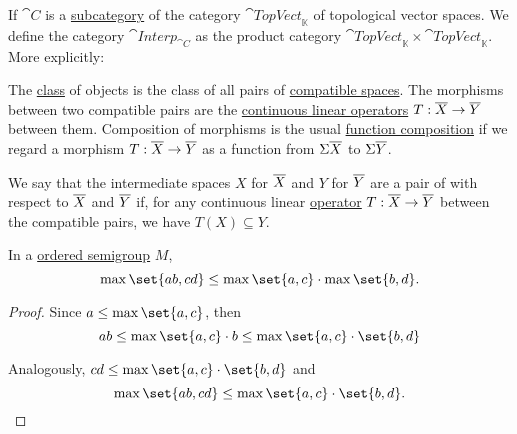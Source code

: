 \begin{definition}
\begin{thmenum}
     If \( \cat{C} \) is a \hyperref[def:subcategory]{subcategory} of the category \hyperref[def:category_of_topological_vector_spaces]{\( \cat{TopVect}_{\BbbK} \)} of topological vector spaces. We define the category \( \cat{Interp}_{\cat{C}} \) as the product category \( \cat{TopVect}_{\BbbK} \times \cat{TopVect}_{\BbbK} \). More explicitly:
    \begin{refenum}
       The \hyperref[def:set]{class} of objects is the class of all pairs of \hyperref[def:interpolated_topological_vector_space/compatibility]{compatible spaces}.
       The morphisms between two compatible pairs are the \hyperref[def:interpolated_topological_vector_space/morphisms]{continuous linear operators} \( T: \oline{X} \to \oline{Y} \) between them.
       Composition of morphisms is the usual \hyperref[def:set_valued_map/composition]{function composition} if we regard a morphism \( T: \oline{X} \to \oline{Y} \) as a function from \( \Sigma \oline{X} \) to \( \Sigma \oline{Y} \).
    \end{refenum}

     We say that the intermediate spaces \( X \) for \( \oline{X} \) and \( Y \) for \( \oline{Y} \) are a pair of  with respect to \( \oline{X} \) and \( \oline{Y} \) if, for any continuous linear \hyperref[def:interpolated_topological_vector_space/morphisms]{operator} \( T: \oline{X} \to \oline{Y} \) between the compatible pairs, we have \( T(X) \subseteq Y \).
  \end{thmenum}
\end{definition}

\begin{lemma}\label{thm:ordered_semigroup_max_distributivity}
  In a \hyperref[def:ordered_semigroup]{ordered semigroup} \( M \),
  \begin{equation}\label{eq:thm:ordered_semigroup_max_distributivity}
    \max \set{a b, c d} \leq \max \set{a, c} \cdot \max \set{b, d}.
  \end{equation}
\end{lemma}
\begin{proof}
  Since \( a \leq \max \set{a, c} \), then
  \begin{equation*}
    ab
    \leq
    \max \set{a, c} \cdot b
    \leq
    \max \set{a, c} \cdot \set{b, d}
  \end{equation*}

  Analogously, \( cd \leq \max \set{a, c} \cdot \set{b, d} \) and
  \begin{equation*}
    \max \set{a b, c d} \leq \max \set{a, c} \cdot \set{b, d}.
  \end{equation*}
\end{proof}

